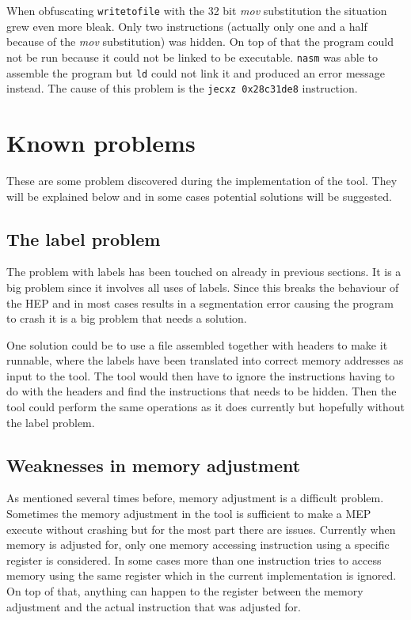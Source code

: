 \documentclass[11pt,twoside]{eitExjobb}
\begin{document}
When obfuscating \texttt{writetofile} with the 32 bit \emph{mov} substitution the situation grew even more bleak. Only two instructions (actually only one and a half because of the \emph{mov} substitution) was hidden. On top of that the program could not be run because it could not be linked to be executable. \texttt{nasm} was able to assemble the program but \texttt{ld}\cite{ld} could not link it and produced an error message instead. The cause of this problem is the \texttt{jecxz 0x28c31de8} instruction.

\section{Known problems}
These are some problem discovered during the implementation of the tool. They will be explained below and in some cases potential solutions will be suggested.

\subsection{The label problem}
The problem with labels has been touched on already in previous sections. It is a big problem since it involves all uses of labels. Since this breaks the behaviour of the HEP and in most cases results in a segmentation error causing the program to crash it is a big problem that needs a solution. 

One solution could be to use a file assembled together with headers to make it runnable, where the labels have been translated into correct memory addresses as input to the tool. The tool would then have to ignore the instructions having to do with the headers and find the instructions that needs to be hidden. Then the tool could perform the same operations as it does currently but hopefully without the label problem. 



\subsection{Weaknesses in memory adjustment}
As mentioned several times before, memory adjustment is a difficult problem. Sometimes the memory adjustment in the tool is sufficient to make a MEP execute without crashing but for the most part there are issues. Currently when memory is adjusted for, only one memory accessing instruction using a specific register is considered. In some cases more than one instruction tries to access memory using the same register which in the current implementation is ignored. On top of that, anything can happen to the register between the memory adjustment and the actual instruction that was adjusted for. 
\end{document}
